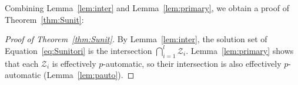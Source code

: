 \documentclass[a4paper,UKenglish,cleveref, autoref, thm-restate]{lipics-v2021}
\newcommand{\mZ}{\mathcal{Z}}
\theoremstyle{definition}
\theoremstyle{definition}
\theoremstyle{definition}
\begin{document}
Combining Lemma~\ref{lem:inter} and Lemma~\ref{lem:primary}, we obtain a proof of Theorem~\ref{thm:Sunit}:
\begin{proof}[Proof of Theorem~\ref{thm:Sunit}]
    By Lemma~\ref{lem:inter}, the solution set of Equation~\eqref{eq:Sunitori} is the intersection $\bigcap_{i = 1}^l \mZ_i$.
    Lemma~\ref{lem:primary} shows that each $\mZ_i$ is effectively $p$-automatic, so their intersection is also effectively $p$-automatic (Lemma~\ref{lem:pauto}).
\end{proof}


\end{document}
